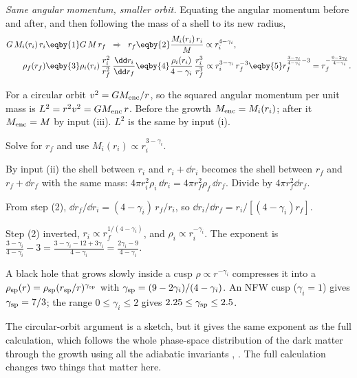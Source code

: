 \emph{Same angular momentum, smaller orbit.} Equating the angular momentum before and after, and then following the mass of a shell to its new radius,
\begin{align}
  G\,M_i(r_i)\,r_i&\eqby{1}G\,M\,r_f
  \;\;\Rightarrow\;\; r_f\eqby{2}\frac{M_i(r_i)\,r_i}{M}\propto r_i^{4-\gamma_i},\nonumber\\
  \rho_f(r_f)&\eqby{3}\rho_i(r_i)\,\frac{r_i^2}{r_f^2}\,\frac{\dd r_i}{\dd r_f}
  \eqby{4}\frac{\rho_i(r_i)}{4-\gamma_i}\,\frac{r_i^3}{r_f^3}
  \propto r_i^{3-\gamma_i}\,r_f^{-3}
  \eqby{5}r_f^{\frac{3-\gamma_i}{4-\gamma_i}-3}
  =r_f^{-\frac{9-2\gamma_i}{4-\gamma_i}} .\label{T2a:eq:spike-slope}
\end{align}
\begin{explain}
  \item For a circular orbit $v^2=GM_{\rm enc}/r$, so the squared angular momentum per unit mass is $L^2=r^2v^2=GM_{\rm enc}\,r$. Before the growth $M_{\rm enc}=M_i(r_i)$; after it $M_{\rm enc}=M$ by input (iii). $L^2$ is the same by input (i).
  \item Solve for $r_f$ and use $M_i(r_i)\propto r_i^{3-\gamma_i}$.
  \item By input (ii) the shell between $r_i$ and $r_i+\dd r_i$ becomes the shell between $r_f$ and $r_f+\dd r_f$ with the same mass: $4\pi r_i^2\rho_i\,\dd r_i=4\pi r_f^2\rho_f\,\dd r_f$. Divide by $4\pi r_f^2\dd r_f$.
  \item From step (2), $\dd r_f/\dd r_i=(4-\gamma_i)\,r_f/r_i$, so $\dd r_i/\dd r_f=r_i/[(4-\gamma_i)r_f]$.
  \item Step (2) inverted, $r_i\propto r_f^{1/(4-\gamma_i)}$, and $\rho_i\propto r_i^{-\gamma_i}$. The exponent is $\frac{3-\gamma_i}{4-\gamma_i}-3=\frac{3-\gamma_i-12+3\gamma_i}{4-\gamma_i}=\frac{2\gamma_i-9}{4-\gamma_i}$.
\end{explain}

\begin{keyidea}
A black hole that grows slowly inside a cusp $\rho\propto r^{-\gamma_i}$ compresses it into a 
$\rho_{\rm sp}(r)=\rho_{\rm sp}(r_{\rm sp}/r)^{\gamma_{\rm sp}}$ with $\gamma_{\rm sp}=(9-2\gamma_i)/(4-\gamma_i)$. An NFW cusp ($\gamma_i=1$) gives $\gamma_{\rm sp}=7/3$; the range $0\le\gamma_i\le2$ gives $2.25\le\gamma_{\rm sp}\le2.5$.
\end{keyidea}

The circular-orbit argument is a sketch, but it gives the same exponent as the full calculation, which follows the whole phase-space distribution of the dark matter through the growth using all the adiabatic invariants \cite{GondoloSilk1999}, \cite[eqs.~(1)--(6)]{Kim2023}. The full calculation changes two things that matter here.

